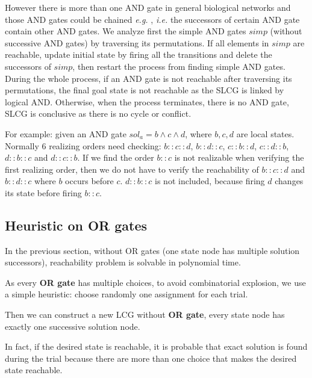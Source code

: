 \documentclass[runningheads]{llncs}
\begin{document}
However there is more than one AND gate in general biological networks and those AND gates could be chained \textit{e.g.} \cite{samaga2009logic}, \textit{i.e.} the successors of certain AND gate contain other AND gates.
We analyze first the simple AND gates $simp$ (without successive AND gates) by traversing its permutations.
If all elements in $simp$ are reachable, update initial state by firing all the transitions and delete the successors of $simp$, then restart the process from finding simple AND gates.
During the whole process, if an AND gate is not reachable after traversing its permutations, the final goal state is not reachable as the SLCG is linked by logical AND. 
Otherwise, when the process terminates, there is no AND gate, SLCG is conclusive as there is no cycle or conflict.


For example: given an AND gate $sol_a=b\land c\land d$, where $b,c,d$ are local states.
Normally 6 realizing orders need checking: $b::c::d$, $b::d::c$, $c::b::d$, $c::d::b$, $d::b::c$ and $d::c::b$. 
If we find the order $b::c$ is not realizable when verifying the first realizing order, then we do not have to verify the reachability of $b::c::d$ and $b::d::c$ where $b$ occurs before $c$. $d::b::c$ is not included, because firing $d$ changes its state before firing $b::c$.


\subsection{Heuristic on OR gates}\label{sec:OR}
In the previous section, without OR gates (one state node has multiple solution successors), reachability problem is solvable in polynomial time.

As every \textbf{OR gate} has multiple choices, to avoid combinatorial explosion, we use a simple heuristic: 
choose randomly one assignment for each trial.

Then we can construct a new LCG without \textbf{OR gate}, every state node has exactly one successive solution node.

In fact, if the desired state is reachable, it is probable that exact solution is found during the trial because there are more than one choice that makes the desired state reachable.
\end{document}
